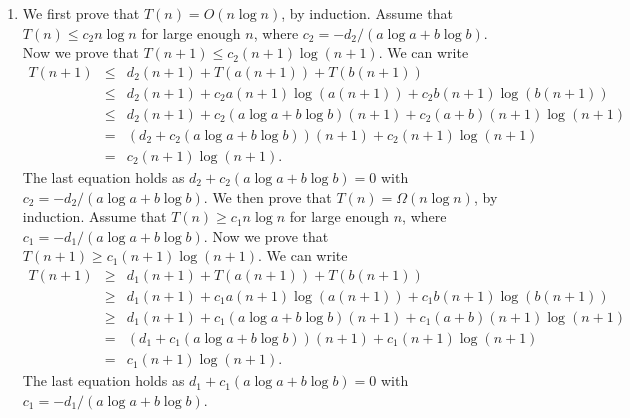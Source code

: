 \documentclass[11pt]{article}
\begin{document}
\begin{qunlist}
\begin{enumerate}
\item
We first prove that $T(n) = O(n\log n)$, by induction.
Assume that $T(n) \le c_2n\log n$ for large enough $n$, where $c_2 = -d_2 / (a\log a + b\log b)$.
Now we prove that $T(n + 1) \le c_2(n+1)\log (n+1)$.
We can write
\begin{eqnarray*}
T(n + 1)  & \le & d_2(n+1) + T(a(n+1)) + T(b(n+1)) \\
          & \le & d_2(n+1) + c_2a(n+1)\log (a(n+1)) + c_2b(n+1) \log (b(n+1))\\
          & \le & d_2(n+1) + c_2(a\log a + b\log b)(n+1) + c_2(a+b)(n+1)\log (n+1)\\
          & = & (d_2 + c_2(a\log a + b\log b))(n+1) + c_2(n+1)\log (n+1)\\
		  & =   & c_2(n+1)\log (n+1).
\end{eqnarray*}
The last equation holds as $d_2 + c_2(a\log a+b\log b) = 0$ with $c_2 = -d_2 / (a\log a + b\log b)$.
We then prove that $T(n) = \Omega(n\log n)$, by induction.
Assume that $T(n) \ge c_1n\log n$ for large enough $n$, where $c_1 = -d_1 / (a\log a + b\log b)$.
Now we prove that $T(n + 1) \ge c_1(n+1)\log (n+1)$.
We can write
\begin{eqnarray*}
T(n + 1)  & \ge & d_1(n+1) + T(a(n+1)) + T(b(n+1)) \\
          & \ge & d_1(n+1) + c_1a(n+1)\log (a(n+1)) + c_1b(n+1) \log (b(n+1))\\
          & \ge & d_1(n+1) + c_1(a\log a + b\log b)(n+1) + c_1(a+b)(n+1)\log (n+1)\\
          & = & (d_1 + c_1(a\log a + b\log b))(n+1) + c_1(n+1)\log (n+1)\\
		  & =   & c_1(n+1)\log (n+1).
\end{eqnarray*}
The last equation holds as $d_1 + c_1(a\log a+b\log b) = 0$ with $c_1 = -d_1 / (a\log a + b\log b)$.
\end{enumerate}


\end{qunlist}
\end{document}
